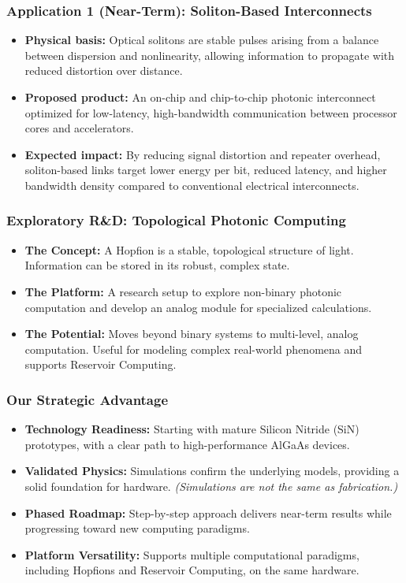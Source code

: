 \documentclass{beamer}
\begin{document}
\begin{frame}
    \frametitle{Application 1 (Near-Term): Soliton-Based Interconnects}

    \begin{itemize}
        \item \textbf{Physical basis:} Optical solitons are stable pulses arising from a balance between dispersion and nonlinearity, allowing information to propagate with reduced distortion over distance.
        
        \item \textbf{Proposed product:} An on-chip and chip-to-chip photonic interconnect optimized for low-latency, high-bandwidth communication between processor cores and accelerators.
        
        \item \textbf{Expected impact:} By reducing signal distortion and repeater overhead, soliton-based links target lower energy per bit, reduced latency, and higher bandwidth density compared to conventional electrical interconnects.
    \end{itemize}
\end{frame}
\begin{frame}
    \frametitle{Exploratory R\&D: Topological Photonic Computing}
    \begin{itemize}
        \item \textbf{The Concept:} A \alert{Hopfion} is a stable, topological structure of light. Information can be stored in its robust, complex state.
        \item \textbf{The Platform:} A research setup to explore non-binary photonic computation and develop an analog module for specialized calculations.
        \item \textbf{The Potential:} Moves beyond binary systems to multi-level, analog computation. Useful for modeling complex real-world phenomena and supports \alert{Reservoir Computing}.
    \end{itemize}
\end{frame}

\begin{frame}
    \frametitle{Our Strategic Advantage}
    \begin{itemize}
        \item \textbf{Technology Readiness:} Starting with mature Silicon Nitride (SiN) prototypes, with a clear path to high-performance AlGaAs devices.
        \item \textbf{Validated Physics:} Simulations confirm the underlying models, providing a solid foundation for hardware. \textit{(Simulations are not the same as fabrication.)}
        \item \textbf{Phased Roadmap:} Step-by-step approach delivers near-term results while progressing toward new computing paradigms.
        \item \textbf{Platform Versatility:} Supports multiple computational paradigms, including Hopfions and Reservoir Computing, on the same hardware.
    \end{itemize}
\end{frame}
\end{document}
